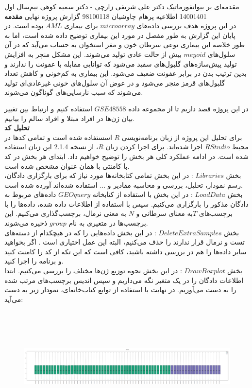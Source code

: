 \documentclass[a4paper,12pt]{article}
\begin{document}
\handout
{مقدمه‌ای بر بیوانفورماتیک}
{دکتر علی شریفی زارچی - دکتر سمیه کوهی}
{نیم‌سال اول 1400\lr{-}1401}
{اطلاعیه}
{پرهام چاوشیان}
{98100118}
 {گزارش پروژه نهایی}
\textbf{مقدمه}\\
در این پروژه هدف بررسی داده‌های
$microarray$
برای بیماری
$AML$
بوده است. در پایان این گزارش به طور مفصل در مورد این بیماری توضیح داده شده است، اما به طور خلاصه این بیماری نوعی سرطان خون و مغز استخوان به حساب می‌آید که در آن سلول‌های
$meyoid$
بیش از حالت عادی تولید می‌شوند. این مشکل منچر به افزایش تولید پیش‌سازه‌های گلبول‌های سفید می‌شود که توانایی مقابله با عفونت را ندارند و بدین ترتیب بدن در برابر عفونت ضعیف می‌شود. این بیماری به کم‌خونی و کاهش تعداد گلبول‌های قرمز منجر می‌شود و در عوض آن سلول‌های خونی غیرعادی‌ای تولید می‌شوند که سبب نارسایی‌های گوناگون می‌شوند.
\par{}
در این پروژه قصد داریم تا از مجموعه داده
$GSE48558$
استفاده کنیم و ارتباط بین تغییر بیان ژن‌ها در افراد مبتلا و افراد سالم را بیابیم.\\
\textbf{تحلیل کد} \\
برای تحلیل این پروژه از زبان برنامه‌نویسی $R$ اسستفاده شده است و تمامی کدها در محیط $RStudio$ اجرا شده‌اند. برای اجرا کردن زبان $R$، از نسخه 2.1.4 این زبان استفاده شده است. در ادامه عملکرد کلی هر بخش را توضیح خواهیم داد. ابتدای هر بخش در کد با کامنتی با همان عنوان مشخص شده است.\\
بخش
$Libraries$ :
در این بخش تمامی کتابخانه‌ها مورد نیاز که برای بارگزاری دادگان، رسم نمودار، تحلیل، بررسی و محاسبه مقادیر و ... استفاده شده‌اند آورده شده است.\\
بخش
$Load Data$ :
در این بخش با استفاده از کتابخانه
$GEOquery$
داده‌های مربوط به دادگان مذکور را بارگزاری می‌کنیم. سپس با استفاده از اطلاعات داده شده، داده‌ها را با برچسب‌های $T$به معنای سرطانی و $N$ به معنی نرمال، برچسب‌گذاری می‌کنیم. این برچسب‌ها در متغیری به نام $group$ ذخیره می‌شوند.\\
بخش
$DeleteExtraSamples$ :
در این بخش داده‌هایی را که در هیچکدام از دسته‌های تست و نرمال قرار ندارند را حذف می‌کنیم، البته این عمل اختیاری است . اگر بخواهید سایر داده‌ها را هم در بررسی داشته باشید، کافی است که این تکه از کد را کامنت کنید و برنامه را اجرا کنید.\\
بخش
$Draw Boxplot$ :
در این بخش نحوه توزیع ژن‌‌ها مختلف را بررسی می‌کنیم. ابتدا اطلاعات دادگان را در یک متغیر نگه می‌داریم و سپس اندیس برچسب‌های مرتب شده را به دست می‌آوریم. در نهایت با استفاده از توابع کتاب‌خانه‌ای، نمودار زیر به دست می‌آید:
\begin{figure}[H]
 \centering
  \includegraphics[width=\linewidth , height=6cm]{../../results/boxplot.png}
\end{figure}
\end{document}
